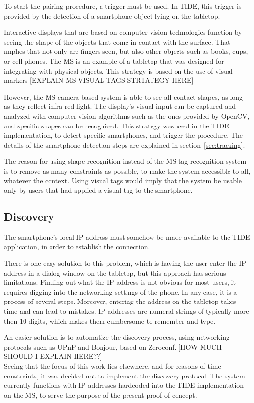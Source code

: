 To start the pairing procedure, a trigger must be used.
In TIDE, this trigger is provided by the detection of a smartphone object lying on the tabletop.

Interactive displays that are based on computer-vision technologies function by seeing the shape of the objects that come in contact with the surface.
That implies that not only are fingers seen, but also other objects such as books, cups, or cell phones.
The MS is an example of a tabletop that was designed for integrating with physical objects.
This strategy is based on the use of visual markers
[EXPLAIN MS VISUAL TAGS STRTATEGY HERE]

However, the MS camera-based system is able to see all contact shapes, as long as they reflect infra-red light.
The display's visual input can be captured and analyzed with computer vision algorithms such as the ones provided by OpenCV, and specific shapes can be recognized.
This strategy was used in the TIDE implementation, to detect specific smartphones, and trigger the procedure.
The details of the smartphone detection steps are explained in section~\ref{sec:tracking}.

The reason for using shape recognition instead of the MS tag recognition system is to remove as many constraints as possible, to make the system accessible to all, whatever the context.
Using visual tags would imply that the system be usable only by users that had applied a visual tag to the smartphone.

\subsection{Discovery}

The smartphone's local IP address must somehow be made available to the TIDE application, in order to establish the connection.

There is one easy solution to this problem, which is having the user enter the IP address in a dialog window on the tabletop, but this approach has serious limitations.
Finding out what the IP address is not obvious for most users, it requires digging into the networking settings of the phone.
In any case, it is a process of several steps.
Moreover, entering the address on the tabletop takes time and can lead to mistakes.
IP addresses are numeral strings of typically more then 10 digits, which makes them cumbersome to remember and type.

An easier solution is to automatize the discovery process, using networking protocols such as UPnP and Bonjour, based on Zeroconf.
[HOW MUCH SHOULD I EXPLAIN HERE??]
\\
\linebreak
Seeing that the focus of this work lies elsewhere, 
 and for reasons of time constraints, it was decided not to implement the discovery protocol.
The system currently functions with IP addresses hardcoded into the TIDE implementation on the MS, to serve the purpose of the present proof-of-concept.

